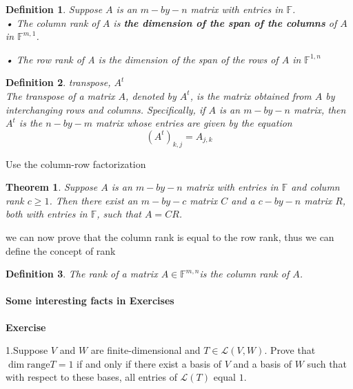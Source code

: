 \documentclass{article}
\newtheorem{theorem}{Theorem}[subsection]
\newtheorem{definition}{Definition}[subsection]
\newenvironment{exercise}{%
{\textbf{Exercise\\}
    }
}{
}
\newcommand{\FF}{\mathbb{F}}
\begin{document}
\begin{CJK}{UTF8}{gkai}
\begin{definition}
    Suppose $A$ is an $m-by-n$ matrix with entries in $\FF$.\\

    • The column rank of $A$ is \textbf{the dimension of the span of the columns} of $A$ in $\FF^{m,1}$.

    • The row rank of A is the dimension of the span of the rows of $A$ in $\FF^{1,n}$

\end{definition}


\begin{definition}
    transpose, $A^t$\\

    The transpose of a matrix $A$, denoted by $A^t$, is the matrix obtained from $A$ by interchanging rows and columns. Specifically, if $A$ is an $m-by-n$ matrix, then $A^t$ is the $n-by-m$ matrix whose entries are given by the equation
    \[(A^t)_{k,j} = A_{j,k}\]
\end{definition}

Use the column-row factorization

\begin{theorem}
    
    Suppose $A$ is an $m-by-n$ matrix with entries in $\FF$ and column rank $c \geq 1$. Then there exist an $m-by-c$ matrix $C$ and a $c-by-n$ matrix $R$, both with entries in $\FF$, such that $A = CR$.
    
\end{theorem}

we can now prove that the column rank is equal to the row rank, thus we can define the concept of rank

\begin{definition}

    The rank of a matrix $A\in \FF^{m,n}$is the column rank of $A$.
\end{definition}

\paragraph{Some interesting facts in Exercises\\}

\begin{exercise}
    
1.Suppose $V$ and $W$ are finite-dimensional and $T \in \mathcal{L}(V,W)$. Prove that $\dim \text{range} T = 1$ if and only if there exist a basis of $V$ and a basis of $W$ such that with respect to these bases, all entries of $\mathcal{L}(T)$ equal $1$.\\
\end{exercise}


\end{CJK}
\end{document}

